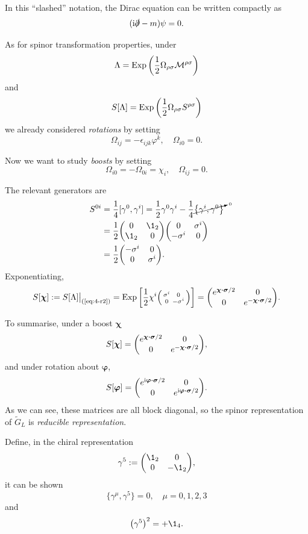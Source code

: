 \documentclass[a4paper,11pt]{article}
\begin{document}
	In this ``slashed'' notation, the Dirac equation can be written compactly as 
	\[
		(\mathrm{i} \slashed \partial - m) \psi = 0.
	\]

	As for spinor transformation properties, under 
	\[
		\Lambda = \operatorname{Exp} \left( \frac{1}{2} \Omega _{\rho \sigma} \mathcal{M}^{\rho \sigma} \right)
	\]
	and 
	\[
		S[\Lambda] = \operatorname{Exp}\left( \frac{1}{2} \Omega _{\rho \sigma} S ^{\rho \sigma} \right)	
	\]
	we already considered \emph{rotations} by setting 
	\[
		\Omega _{ij} = - \epsilon _{ijk} \varphi^k,\quad \Omega _{i0} = 0.
		\tag{R1}
		\label{eq:4-r1}
	\]
	
	Now we want to study \emph{boosts} by setting
	\[
		\Omega _{i0} = - \Omega _{0i} = \chi_i,\quad \Omega _{ij} = 0.
		\tag{R2}
		\label{eq:4-r2}
	\]
	
	The relevant generators are
	\begin{align*}
		S ^{0i} &= \frac{1}{4} [\gamma^0, \gamma^i] = \frac{1}{2} \gamma^0 \gamma^i - \frac{1}{4} \cancelto{\text{\tiny 0}}{\left\{ \gamma^i, \gamma^0 \right\}}\\
		& = \frac{1}{2} \mqty(0 & \1_2\\ \1_2 & 0) \mqty(0 &\sigma^i\\ - \sigma^i & 0)\\
		& = \frac{1}{2} \mqty(- \sigma^i & 0 \\ 0 & \sigma^i).
	\end{align*}
	Exponentiating,
	\[
		S[\bm \chi] := S[\Lambda]\big|_{\text{(\ref{eq:4-r2})}} = \Exp \left[ \frac{1}{2} \chi^i \smqty(\sigma^i & 0 \\ 0 & - \sigma^i) \right] = \mqty(e ^{\bm \chi \vdot \bm \sigma / 2} & 0 \\ 0 & e ^{-\bm \chi \vdot \bm \sigma/2} ).
	\]
	
	To summarise, under a boost $\bm \chi$
	\[
		S[\bm \chi] = \mqty(e ^{\bm \chi \vdot \bm \sigma / 2} & 0 \\ 0 & e ^{- \bm \chi \vdot \bm \sigma / 2}),
	\]
	and under rotation about $\bm \varphi$, 
	\[
		S[\bm \varphi] = \mqty(e ^{\mathrm{i} \bm \varphi \vdot \bm \sigma/2} & 0 \\ 0 & e ^{\mathrm{i} \bm \varphi \vdot \bm \sigma / 2}).
	\]
	As we can see, these matrices are all block diagonal, so the spinor representation of $\tilde G_L$ is \emph{reducible representation}. 

	Define, in the chiral representation
	\[
		\gamma^5 := \mqty(\1_2 & 0 \\ 0 & - \1_2),
	\]
	it can be shown
	\[
		\{\gamma^\mu, \gamma^5\} = 0, \quad \mu = 0,1,2,3
	\]
	and 
	\[
		\left( \gamma^5 \right)^2 = + \1_4.
	\]
	
\end{document}
